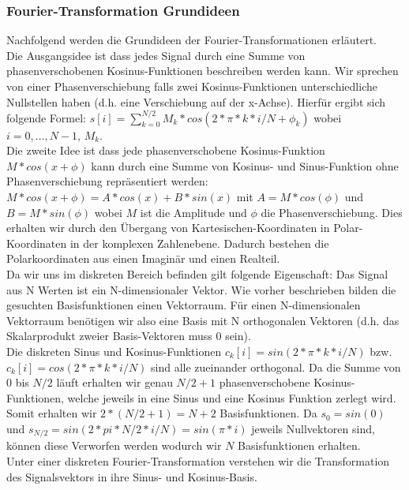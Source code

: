 \documentclass{article} %
\begin{document}
		\subsubsection{Fourier-Transformation Grundideen}
		Nachfolgend werden die Grundideen der Fourier-Transformationen erläutert.\\
		Die Ausgangsidee ist dass jedes Signal durch eine Summe von phasenverschobenen Kosinus-Funktionen beschreiben werden kann. Wir sprechen von einer Phasenverschiebung falls zwei Kosinus-Funktionen unterschiedliche Nullstellen haben (d.h. eine Verschiebung auf der x-Achse). Hierfür ergibt sich folgende Formel: $s[i] = \sum_{k=0}^{N/2} M_{k}*cos(2*\pi*k*i/N+\phi_{k})$ wobei $i = 0,\dots,N-1$, $M_{k}$.\\
		Die zweite Idee ist dass jede phasenverschobene Kosinus-Funktion $M*cos(x+\phi)$ kann durch eine Summe von Kosinus- und Sinus-Funktion ohne Phasenverschiebung repräsentiert werden: $M*cos(x+\phi) = A*cos(x) + B*sin(x)$ mit $A=M*cos(\phi)$ und $B=M*sin(\phi)$ wobei $M$ ist die Amplitude und $\phi$ die Phasenverschiebung. Dies erhalten wir durch den Übergang von Kartesischen-Koordinaten in Polar-Koordinaten in der komplexen Zahlenebene. Dadurch bestehen die  Polarkoordinaten  aus einen Imaginär und einen Realteil.\\
		Da wir uns im diskreten Bereich befinden gilt folgende Eigenschaft: Das Signal aus N Werten ist ein N-dimensionaler Vektor. Wie vorher beschrieben bilden die gesuchten Basisfunktionen einen Vektorraum. Für einen N-dimensionalen Vektorraum benötigen wir also eine Basis mit N orthogonalen Vektoren (d.h. das Skalarprodukt zweier Basis-Vektoren muss 0 sein).\\
		Die diskreten Sinus und Kosinus-Funktionen $c_{k}[i] = sin(2*\pi*k*i/N)$ bzw. $c_{k}[i] = cos(2*\pi*k*i/N)$ sind alle zueinander orthogonal. Da die Summe von 0 bis $N/2$ läuft erhalten wir genau $N/2+1$ phasenverschobene Kosinus-Funktionen, welche jeweils in eine Sinus und eine Kosinus Funktion zerlegt wird. Somit erhalten wir $2*(N/2+1) = N+2$ Basisfunktionen. Da $s_{0} = sin(0)$ und $s_{N/2} = sin(2*pi*N/2*i/N) = sin(\pi*i)$ jeweils Nullvektoren sind, können diese Verworfen werden wodurch wir $N$ Basisfunktionen erhalten.\\
		Unter einer diskreten Fourier-Transformation verstehen wir die Transformation des Signalsvektors in ihre Sinus- und Kosinus-Basis.
\end{document}
